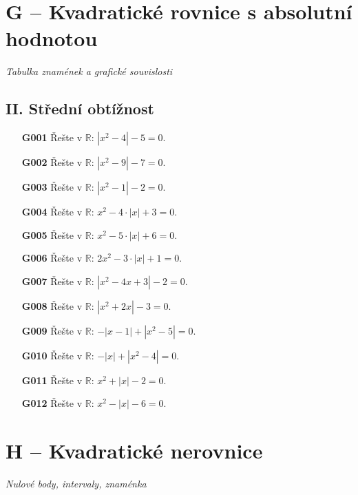 \documentclass[11pt,a4paper]{article}
\begin{document}
\section*{G -- Kvadratické rovnice s absolutní hodnotou}
\textit{Tabulka znamének a grafické souvislosti}
\subsection*{II. Střední obtížnost}
\begin{enumerate}[label={},itemsep=5pt]
\item[\textbf{G001}] Řešte v $\mathbb R$: $\left|{x^{2} - 4}\right| - 5=0$.
\item[\textbf{G002}] Řešte v $\mathbb R$: $\left|{x^{2} - 9}\right| - 7=0$.
\item[\textbf{G003}] Řešte v $\mathbb R$: $\left|{x^{2} - 1}\right| - 2=0$.
\item[\textbf{G004}] Řešte v $\mathbb R$: $x^{2} - 4 \cdot \left|{x}\right| + 3=0$.
\item[\textbf{G005}] Řešte v $\mathbb R$: $x^{2} - 5 \cdot \left|{x}\right| + 6=0$.
\item[\textbf{G006}] Řešte v $\mathbb R$: $2x^{2} - 3 \cdot \left|{x}\right| + 1=0$.
\item[\textbf{G007}] Řešte v $\mathbb R$: $\left|{x^{2} - 4x + 3}\right| - 2=0$.
\item[\textbf{G008}] Řešte v $\mathbb R$: $\left|{x^{2} + 2x}\right| - 3=0$.
\item[\textbf{G009}] Řešte v $\mathbb R$: $- \left|{x - 1}\right| + \left|{x^{2} - 5}\right|=0$.
\item[\textbf{G010}] Řešte v $\mathbb R$: $- \left|{x}\right| + \left|{x^{2} - 4}\right|=0$.
\item[\textbf{G011}] Řešte v $\mathbb R$: $x^{2} + \left|{x}\right| - 2=0$.
\item[\textbf{G012}] Řešte v $\mathbb R$: $x^{2} - \left|{x}\right| - 6=0$.
\end{enumerate}
\section*{H -- Kvadratické nerovnice}
\textit{Nulové body, intervaly, znaménka}
\end{document}
